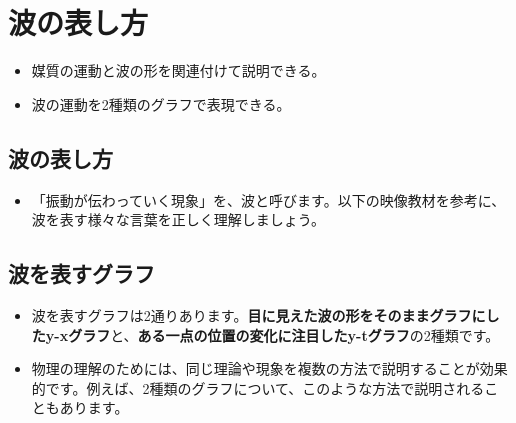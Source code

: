 \documentclass[
  letterpaper,
]{bxjsbook}
\providecommand{\tightlist}{%
  \setlength{\itemsep}{0pt}\setlength{\parskip}{0pt}}\usepackage{longtable,booktabs,array}
\begin{document}

\chapter{波の表し方}\label{ux6ce2ux306eux8868ux3057ux65b9}

\begin{tcolorbox}[enhanced jigsaw, breakable, rightrule=.15mm, opacitybacktitle=0.6, title=\textcolor{quarto-callout-tip-color}{\faLightbulb}\hspace{0.5em}{このセクションの目標}, coltitle=black, toprule=.15mm, bottomtitle=1mm, bottomrule=.15mm, toptitle=1mm, titlerule=0mm, arc=.35mm, opacityback=0, left=2mm, colback=white, colbacktitle=quarto-callout-tip-color!10!white, leftrule=.75mm, colframe=quarto-callout-tip-color-frame]

\begin{itemize}
\tightlist
\item
  媒質の運動と波の形を関連付けて説明できる。
\item
  波の運動を2種類のグラフで表現できる。
\end{itemize}

\end{tcolorbox}

\section{波の表し方}\label{ux6ce2ux306eux8868ux3057ux65b9-1}

\begin{itemize}
\item
  「振動が伝わっていく現象」を、波と呼びます。以下の映像教材を参考に、波を表す様々な言葉を正しく理解しましょう。
\end{itemize}

\section{波を表すグラフ}\label{ux6ce2ux3092ux8868ux3059ux30b0ux30e9ux30d5}

\begin{itemize}
\item
  波を表すグラフは2通りあります。\textbf{目に見えた波の形をそのままグラフにしたy-xグラフ}と、\textbf{ある一点の位置の変化に注目したy-tグラフ}の2種類です。
\item
  物理の理解のためには、同じ理論や現象を複数の方法で説明することが効果的です。例えば、2種類のグラフについて、このような方法で説明されることもあります。
\end{itemize}
\end{document}
